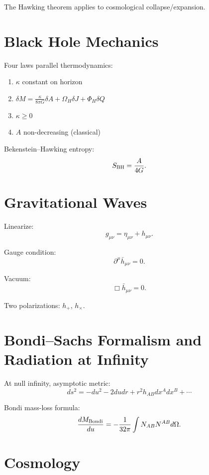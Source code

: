 \documentclass[12pt]{article}
\begin{document}
The Hawking theorem applies to cosmological collapse/expansion.

\section{Black Hole Mechanics}

Four laws parallel thermodynamics:
\begin{enumerate}
\item $\kappa$ constant on horizon  
\item $\delta M= \frac{\kappa}{8\pi G}\delta A + \Omega_H \delta J + \Phi_H\delta Q$  
\item $\kappa\ge0$  
\item $A$ non-decreasing (classical)
\end{enumerate}

Bekenstein–Hawking entropy:
\[
S_{\rm BH} = \frac{A}{4G}.
\]

\section{Gravitational Waves}

Linearize:
\[
g_{\mu\nu}=\eta_{\mu\nu}+h_{\mu\nu}.
\]

Gauge condition:
\[
\partial^\mu \bar h_{\mu\nu}=0.
\]

Vacuum:
\[
\Box \bar h_{\mu\nu}=0.
\]

Two polarizations: $h_+$, $h_\times$.

\section{Bondi--Sachs Formalism and Radiation at Infinity}

At null infinity, asymptotic metric:
\[
ds^2 = -du^2 - 2 du dr + r^2 h_{AB}dx^A dx^B + \cdots
\]

Bondi mass-loss formula:
\[
\frac{dM_{\rm Bondi}}{du} = -\frac{1}{32\pi} \int N_{AB}N^{AB} d\Omega.
\]

\section{Cosmology}
\end{document}
